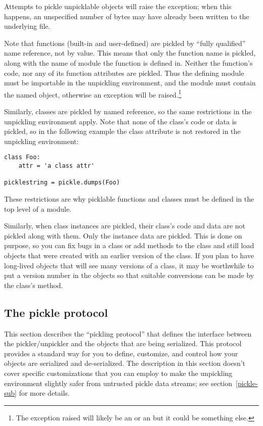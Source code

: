 Attempts to pickle unpicklable objects will raise the
 exception; when this happens, an unspecified
number of bytes may have already been written to the underlying file.

Note that functions (built-in and user-defined) are pickled by ``fully
qualified'' name reference, not by value.  This means that only the
function name is pickled, along with the name of module the function
is defined in.  Neither the function's code, nor any of its function
attributes are pickled.  Thus the defining module must be importable
in the unpickling environment, and the module must contain the named
object, otherwise an exception will be raised.\footnote{The exception
raised will likely be an  or an
 but it could be something else.}

Similarly, classes are pickled by named reference, so the same
restrictions in the unpickling environment apply.  Note that none of
the class's code or data is pickled, so in the following example the
class attribute  is not restored in the unpickling
environment:

\begin{verbatim}
class Foo:
    attr = 'a class attr'

picklestring = pickle.dumps(Foo)
\end{verbatim}

These restrictions are why picklable functions and classes must be
defined in the top level of a module.

Similarly, when class instances are pickled, their class's code and
data are not pickled along with them.  Only the instance data are
pickled.  This is done on purpose, so you can fix bugs in a class or
add methods to the class and still load objects that were created with
an earlier version of the class.  If you plan to have long-lived
objects that will see many versions of a class, it may be worthwhile
to put a version number in the objects so that suitable conversions
can be made by the class's  method.

\subsection{The pickle protocol
\label{pickle-protocol}}

This section describes the ``pickling protocol'' that defines the
interface between the pickler/unpickler and the objects that are being
serialized.  This protocol provides a standard way for you to define,
customize, and control how your objects are serialized and
de-serialized.  The description in this section doesn't cover specific
customizations that you can employ to make the unpickling environment
slightly safer from untrusted pickle data streams; see section~\ref{pickle-sub}
for more details.

